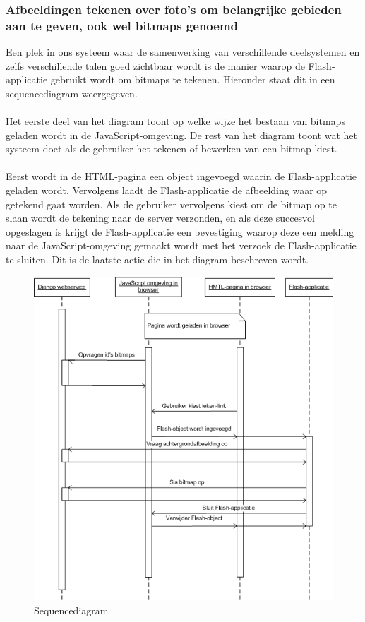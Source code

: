 \subsubsection{Afbeeldingen tekenen over foto's om belangrijke gebieden aan te geven, ook wel bitmaps genoemd}
Een plek in ons systeem waar de samenwerking van verschillende deelsystemen en zelfs verschillende talen goed zichtbaar wordt is de manier waarop de Flash-applicatie gebruikt wordt om bitmaps te tekenen. Hieronder staat dit in een sequencediagram weergegeven.
\\
\\
Het eerste deel van het diagram toont op welke wijze het bestaan van bitmaps geladen wordt in de JavaScript-omgeving. De rest van het diagram toont wat het systeem doet als de gebruiker het tekenen of bewerken van een bitmap kiest.
\\
\\
Eerst wordt in de HTML-pagina een object ingevoegd waarin de Flash-applicatie geladen wordt. Vervolgens laadt de Flash-applicatie de afbeelding waar op getekend gaat worden. Als de gebruiker vervolgens kiest om de bitmap op te slaan wordt de tekening naar de server verzonden, en als deze succesvol opgeslagen is krijgt de Flash-applicatie een bevestiging waarop deze een melding naar de JavaScript-omgeving gemaakt wordt met het verzoek de Flash-applicatie te sluiten. Dit is de laatste actie die in het diagram beschreven wordt.

\begin{figure}[htbp]
\includegraphics[width=\textwidth]{sequencediagram}
\caption{Sequencediagram}
\label{fig:sequencediagram}
\end{figure}


